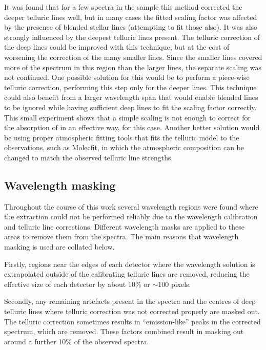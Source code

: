 It was found that for a few spectra in the sample this method corrected the deeper telluric lines well, but in many cases the fitted scaling factor was affected by the presence of blended stellar lines (attempting to fit those also).
It was also strongly influenced by the deepest  telluric lines present.
The telluric correction of the deep  lines could be improved with this technique, but at the cost of worsening the correction of the many smaller  lines.
Since the smaller  lines covered more of the spectrum in this region than the larger lines, the separate  scaling was not continued.
One possible solution for this would be to perform a piece-wise telluric correction, performing this step only for the deeper  lines.
This technique could also benefit from a larger wavelength span that would enable blended lines to be ignored while having sufficient deep  lines to fit the scaling factor correctly.
This small experiment shows that a simple scaling is not enough to correct for the absorption of  in an effective way, for this case.
Another better solution would be using proper atmospheric fitting tools that fits the telluric model to the observations, such as {Molecfit}, in which the atmospheric composition can be changed to match the observed telluric line strengths.


\subsection{Wavelength masking}
Throughout the course of this work several wavelength regions were found where the extraction could not be performed reliably due to the wavelength calibration and telluric line corrections.
Different wavelength masks are applied to these areas to remove them from the spectra.
The main reasons that wavelength masking is used are collated below.

Firstly, regions near the edges of each detector where the wavelength solution is extrapolated outside of the calibrating telluric lines are removed, reducing the effective size of each detector by about \(10\%\) or \(\sim100\) pixels.

Secondly, any remaining artefacts present in the spectra and the centres of deep telluric lines where telluric correction was not corrected properly are masked out.
The telluric correction sometimes results in ``emission-like'' peaks in the corrected spectrum, which are removed.
These factors combined result in masking out around a further 10\% of the observed spectra.

